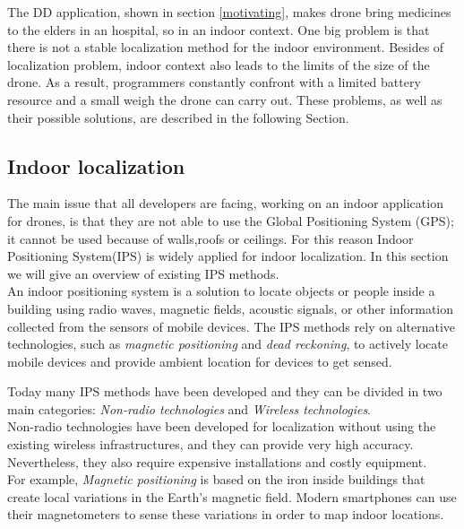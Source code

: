 The DD application, shown in section \ref{motivating}, makes drone bring medicines to the elders in an hospital, so in an indoor context.
One big problem is that there is not a stable localization method for the indoor environment.
Besides of localization problem, indoor context also leads to the limits of the size of the drone.
As a result, programmers constantly confront with a limited battery resource and a small weigh the drone can carry out. These problems, as well as their possible solutions, are described in the following Section.

\subsection{Indoor localization}

The main issue that all developers are facing, working on an indoor application for drones, is that they are not able to use the Global Positioning System (GPS); it cannot be used because of walls,roofs or ceilings.
For this reason Indoor Positioning System(IPS) is widely applied for indoor localization. In this section we will give an overview of existing IPS methods.  
\\

An indoor positioning system is a solution to locate objects or people inside a building using radio waves, magnetic fields, acoustic signals, or other information collected from the sensors of mobile devices.
The IPS methods rely on alternative technologies, such as \textit{magnetic positioning} and \textit{dead reckoning}, to actively locate mobile devices and provide ambient location for devices to get sensed.

Today many IPS methods have been developed and they can be divided in two main categories: \textit{Non-radio technologies} and \textit{Wireless technologies}.
\\

Non-radio technologies have been developed for localization without using the existing wireless infrastructures, and they can provide very high accuracy.
Nevertheless, they also require expensive installations and costly equipment.
\\

For example, \textit{Magnetic positioning}\cite{magnetic} is based on the iron inside buildings that create local variations in the Earth’s magnetic field.
Modern smartphones can use their magnetometers to sense these variations in order to map indoor locations.
\\

